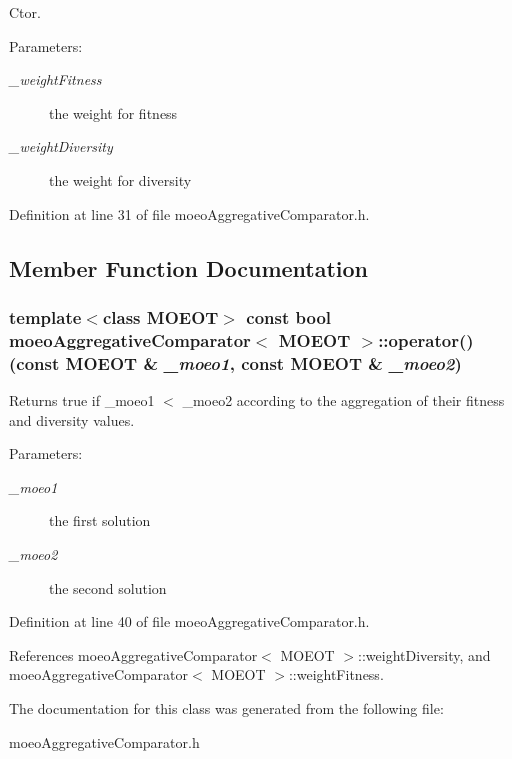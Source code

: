 Ctor. 

\begin{Desc}
\item[Parameters:]
\begin{description}
\item[{\em \_\-weight\-Fitness}]the weight for fitness \item[{\em \_\-weight\-Diversity}]the weight for diversity \end{description}
\end{Desc}


Definition at line 31 of file moeo\-Aggregative\-Comparator.h.

\subsection{Member Function Documentation}
\subsubsection{\setlength{\rightskip}{0pt plus 5cm}template$<$class MOEOT$>$ const bool \bf{moeo\-Aggregative\-Comparator}$<$ MOEOT $>$::operator() (const MOEOT \& {\em \_\-moeo1}, const MOEOT \& {\em \_\-moeo2})\hspace{0.3cm}{\tt  [inline]}}\label{classmoeoAggregativeComparator_2f6745ebc2d575e64b162fc250f04b0f}


Returns true if \_\-moeo1 $<$ \_\-moeo2 according to the aggregation of their fitness and diversity values. 

\begin{Desc}
\item[Parameters:]
\begin{description}
\item[{\em \_\-moeo1}]the first solution \item[{\em \_\-moeo2}]the second solution \end{description}
\end{Desc}


Definition at line 40 of file moeo\-Aggregative\-Comparator.h.

References moeo\-Aggregative\-Comparator$<$ MOEOT $>$::weight\-Diversity, and moeo\-Aggregative\-Comparator$<$ MOEOT $>$::weight\-Fitness.

The documentation for this class was generated from the following file:\begin{CompactItemize}
\item 
moeo\-Aggregative\-Comparator.h\end{CompactItemize}
